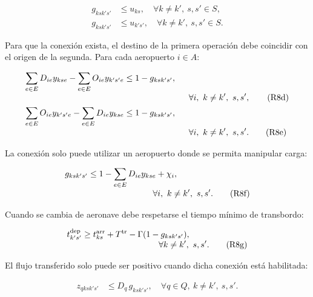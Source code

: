\begin{align}
g_{ksk's'}
&\leq
u_{ks},
\quad
\forall k\neq k',\ s,s'\in S,
\tag{R8b}
\label{eq:r8b}
\\
g_{ksk's'}
&\leq
u_{k's'},
\quad
\forall k\neq k',\ s,s'\in S.
\tag{R8c}
\label{eq:r8c}
\end{align}

Para que la conexión exista, el destino de la primera operación debe coincidir con el origen
de la segunda. Para cada aeropuerto $i\in A$:

\begin{align}
\sum_{e\in E}D_{ie}y_{kse}
-
\sum_{e\in E}O_{ie}y_{k's'e}
&\leq
1-g_{ksk's'},
\nonumber\\[-1mm]
&\hspace{2.7cm}
\forall i,\ k\neq k',\ s,s',
\tag{R8d}
\label{eq:r8d}
\\
\sum_{e\in E}O_{ie}y_{k's'e}
-
\sum_{e\in E}D_{ie}y_{kse}
&\leq
1-g_{ksk's'},
\nonumber\\[-1mm]
&\hspace{2.7cm}
\forall i,\ k\neq k',\ s,s'.
\tag{R8e}
\label{eq:r8e}
\end{align}

La conexión solo puede utilizar un aeropuerto donde se permita manipular carga:

\begin{align}
g_{ksk's'}
&\leq
1-
\sum_{e\in E}D_{ie}y_{kse}
+
\chi_i,
\nonumber\\[-1mm]
&\hspace{2.7cm}
\forall i,\ k\neq k',\ s,s'.
\tag{R8f}
\label{eq:r8f}
\end{align}

Cuando se cambia de aeronave debe respetarse el tiempo mínimo de transbordo:

\begin{align}
t_{k's'}^{\mathrm{dep}}
&\geq
t_{ks}^{\mathrm{arr}}
+
T^{\mathrm{tr}}
-
\Gamma(1-g_{ksk's'}),
\nonumber\\[-1mm]
&\hspace{3.2cm}
\forall k\neq k',\ s,s'.
\tag{R8g}
\label{eq:r8g}
\end{align}

El flujo transferido solo puede ser positivo cuando dicha conexión está habilitada:

\begin{align}
z_{qksk's'}
&\leq
D_q\,g_{ksk's'},
\quad
\forall q\in Q,\ k\neq k',\ s,s'.
\tag{R8h}
\label{eq:r8h}
\end{align}

